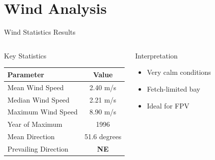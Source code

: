 \documentclass[10pt]{beamer}
\begin{document}
\section{Wind Analysis}

\begin{frame}{Wind Statistics Results}
\begin{columns}
\begin{block}{Key Statistics}
\begin{tabular}{lc}
\hline
\textbf{Parameter} & \textbf{Value} \\
\hline
Mean Wind Speed & 2.40 m/s \\
Median Wind Speed & 2.21 m/s \\
Maximum Wind Speed & \alert{8.90 m/s} \\
Year of Maximum & \alert{1996} \\
Mean Direction & 51.6 degrees \\
Prevailing Direction & \textbf{NE} \\
\hline
\end{tabular}
\end{block}

\begin{block}{Interpretation}
\begin{itemize}
    \item Very calm conditions
    \item Fetch-limited bay
    \item Ideal for FPV
\end{itemize}
\end{block}
\end{columns}
\end{frame}
\end{document}
